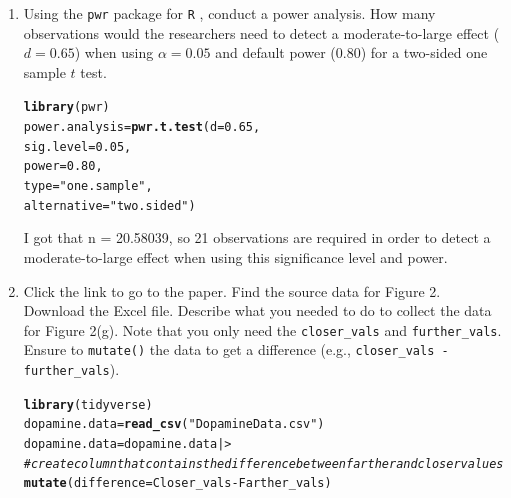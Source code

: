 \documentclass{article}\usepackage[]{graphicx}\usepackage[]{xcolor}
\makeatletter
\newcommand{\hlnum}[1]{\textcolor[rgb]{0.686,0.059,0.569}{#1}}%
\newcommand{\hlsng}[1]{\textcolor[rgb]{0.192,0.494,0.8}{#1}}%
\newcommand{\hlcom}[1]{\textcolor[rgb]{0.678,0.584,0.686}{\textit{#1}}}%
\newcommand{\hlopt}[1]{\textcolor[rgb]{0,0,0}{#1}}%
\newcommand{\hldef}[1]{\textcolor[rgb]{0.345,0.345,0.345}{#1}}%
\newcommand{\hlkwb}[1]{\textcolor[rgb]{0.69,0.353,0.396}{#1}}%
\newcommand{\hlkwc}[1]{\textcolor[rgb]{0.333,0.667,0.333}{#1}}%
\newcommand{\hlkwd}[1]{\textcolor[rgb]{0.737,0.353,0.396}{\textbf{#1}}}%
\newenvironment{kframe}{%
 \def\at@end@of@kframe{}%
 \ifinner\ifhmode%
  \def\at@end@of@kframe{\end{minipage}}%
  \begin{minipage}{\columnwidth}%
 \fi\fi%
 \def\FrameCommand##1{\hskip\@totalleftmargin \hskip-\fboxsep
 \colorbox{shadecolor}{##1}\hskip-\fboxsep
     \hskip-\linewidth \hskip-\@totalleftmargin \hskip\columnwidth}%
 \MakeFramed {\advance\hsize-\width
   \@totalleftmargin\z@ \linewidth\hsize
   \@setminipage}}%
 {\par\unskip\endMakeFramed%
 \at@end@of@kframe}
\newenvironment{knitrout}{}{} %
\makeatother
\begin{document}
\begin{enumerate}
\item Using the \texttt{pwr} package for \texttt{R} \citep{pwr},
conduct a power analysis. How many observations would the researchers 
need to detect a moderate-to-large effect ($d=0.65$) when using 
$\alpha=0.05$ and default power (0.80) for a two-sided one sample 
$t$ test.
\begin{knitrout}
\color{fgcolor}\begin{kframe}
\begin{alltt}
\hlkwd{library}\hldef{(pwr)}
\hldef{power.analysis} \hlkwb{=} \hlkwd{pwr.t.test}\hldef{(}\hlkwc{d}\hldef{=}\hlnum{0.65}\hldef{,}
                            \hlkwc{sig.level} \hldef{=} \hlnum{0.05}\hldef{,}
                            \hlkwc{power} \hldef{=} \hlnum{0.80}\hldef{,}
                            \hlkwc{type} \hldef{=} \hlsng{"one.sample"}\hldef{,}
                            \hlkwc{alternative} \hldef{=} \hlsng{"two.sided"}\hldef{)}
\end{alltt}
\end{kframe}
\end{knitrout}
I got that n = 20.58039, so 21 observations are required in order to detect a moderate-to-large effect when using this significance level and power.
\item Click the link to go to the paper. Find the source data for 
Figure 2. Download the Excel file. Describe what you needed to
do to collect the data for Figure 2(g). Note that you only need the 
\texttt{closer\_vals} and \texttt{further\_vals}. Ensure to 
\texttt{mutate()} the data to get a difference 
(e.g., \texttt{closer\_vals - further\_vals}).
\begin{knitrout}
\color{fgcolor}\begin{kframe}
\begin{alltt}
\hlkwd{library}\hldef{(tidyverse)}
\hldef{dopamine.data} \hlkwb{=} \hlkwd{read_csv}\hldef{(}\hlsng{"DopamineData.csv"}\hldef{)}
\hldef{dopamine.data} \hlkwb{=} \hldef{dopamine.data |>}
  \hlcom{#create column that contains the difference between farther and closer values}
  \hlkwd{mutate}\hldef{(}\hlkwc{difference} \hldef{= Closer_vals} \hlopt{-} \hldef{Farther_vals)}

\end{alltt}
\end{kframe}
\end{knitrout}
\end{enumerate}
\end{document}
